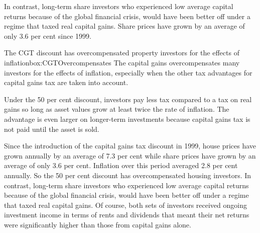 \documentclass{grattan}\usepackage[]{graphicx}\usepackage[]{color}
\begin{document}
In contrast, long-term share investors who experienced low average capital returns because of the global financial crisis, would have been better off under a regime that taxed real capital gains. Share prices have grown by an average of only 3.6 per cent since 1999. 
 

\begin{smallbox}{The CGT discount has overcompensated property investors for the effects of inflation}{box:CGTOvercompensates}
The capital gains overcompensates many investors for the effects of inflation, especially when the other tax advantages for capital gains tax are taken into account.  

Under the 50 per cent discount, investors pay less tax compared to a tax on real gains so long as asset values grow at least twice the rate of inflation. The advantage is even larger on longer-term investments because capital gains tax is not paid until the asset is sold.

Since the introduction of the capital gains tax discount in 1999, house prices have grown annually by an average of 7.3 per cent  while share prices have grown by an average of only 3.6 per cent.  Inflation over this period averaged 2.8 per cent annually.  So the 50 per cent discount has overcompensated housing investors. In contrast, long-term share investors who experienced low average capital returns because of the global financial crisis, would have been better off under a regime that taxed real capital gains. Of course, both sets of investors received ongoing investment income in terms of rents and dividends that meant their net returns were significantly higher than those from capital gains alone.   
\end{smallbox}
\end{document}
